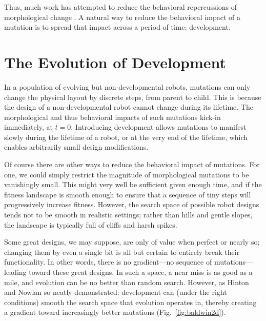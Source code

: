 Thus, much work has attempted to reduce the behavioral repercussions of morphological change \cite{cheney2018scalable}.
A natural way
to reduce the behavioral impact of a mutation 
is to spread that impact across a period of time: development.



\section{The Evolution of Development}


In a population of evolving but non-developmental robots, mutations can only change the physical layout by discrete steps, from parent to child.
This is because the design of a non-developmental robot cannot change during its lifetime.
The morphological and thus behavioral impacts of such mutations kick-in immediately, at $t=0$.
Introducing development allows mutations to manifest slowly during the lifetime of a robot, or at the very end of the lifetime, which enables arbitrarily small design modifications.

Of course there are other ways to reduce the behavioral impact of mutations.
For one, we could simply restrict the magnitude of morphological mutations to be vanishingly small.
This might very well be sufficient given enough time, and if the fitness landscape is smooth enough to ensure that a sequence of tiny steps will progressively increase fitness.
However, the search space of possible robot designs tends not to be smooth in realistic settings; rather than hills and gentle slopes, the landscape is typically full of cliffs and harsh spikes. 

Some great designs, we may suppose, are only of value when perfect or nearly so; changing them by even a single bit is all but certain to entirely break their functionality.
In other words, there is no gradient---no sequence of mutations---leading toward these great designs.
In such a space, a near miss is as good as a mile, and evolution can be no better than random search.
However, as Hinton and Nowlan \cite{hinton1987learning} so neatly demonstrated: development can (under the right conditions) smooth the search space that evolution operates in, thereby creating a gradient toward increasingly better mutations (Fig.~\ref{fig:baldwin2d}).


